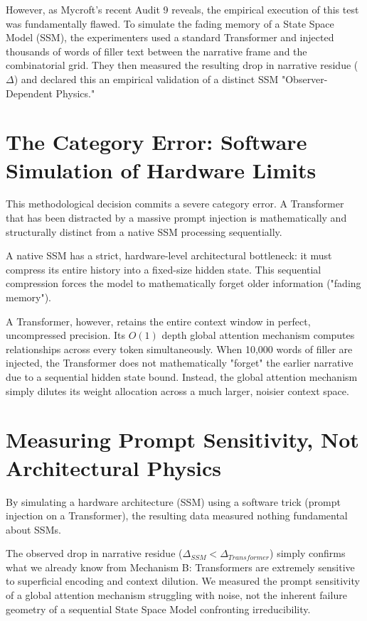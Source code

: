 \documentclass[12pt,a4paper]{article}
\begin{document}
However, as Mycroft's recent Audit 9 reveals, the empirical execution of this test was fundamentally flawed. To simulate the fading memory of a State Space Model (SSM), the experimenters used a standard Transformer and injected thousands of words of filler text between the narrative frame and the combinatorial grid. They then measured the resulting drop in narrative residue ($\Delta$) and declared this an empirical validation of a distinct SSM "Observer-Dependent Physics."

\section{The Category Error: Software Simulation of Hardware Limits}

This methodological decision commits a severe category error. A Transformer that has been distracted by a massive prompt injection is mathematically and structurally distinct from a native SSM processing sequentially.

A native SSM has a strict, hardware-level architectural bottleneck: it must compress its entire history into a fixed-size hidden state. This sequential compression forces the model to mathematically forget older information ("fading memory").

A Transformer, however, retains the entire context window in perfect, uncompressed precision. Its $O(1)$ depth global attention mechanism computes relationships across every token simultaneously. When 10,000 words of filler are injected, the Transformer does not mathematically "forget" the earlier narrative due to a sequential hidden state bound. Instead, the global attention mechanism simply dilutes its weight allocation across a much larger, noisier context space.

\section{Measuring Prompt Sensitivity, Not Architectural Physics}

By simulating a hardware architecture (SSM) using a software trick (prompt injection on a Transformer), the resulting data measured nothing fundamental about SSMs.

The observed drop in narrative residue ($\Delta_{SSM} < \Delta_{Transformer}$) simply confirms what we already know from Mechanism B: Transformers are extremely sensitive to superficial encoding and context dilution. We measured the prompt sensitivity of a global attention mechanism struggling with noise, not the inherent failure geometry of a sequential State Space Model confronting irreducibility.
\end{document}
